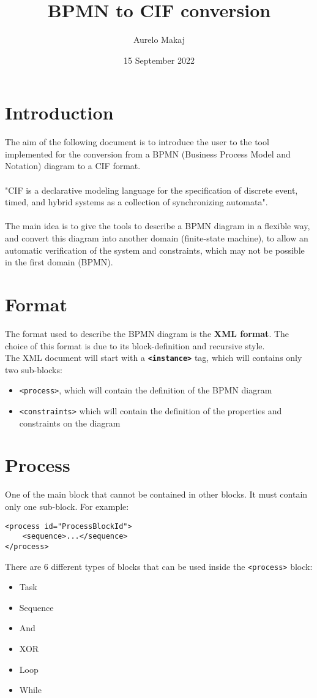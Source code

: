 \documentclass{article}
\title{BPMN to CIF conversion}
\author{Aurelo Makaj}
\date{15 September 2022}
\newcommand*{\xml}[1]{\texttt{<#1>}}
\begin{document}
\maketitle

\section{Introduction}
The aim of the following document is to introduce the user to the tool implemented for the conversion from a BPMN (Business Process Model and Notation) diagram to a CIF format.
\\
\\
"CIF is a declarative modeling language for the specification of discrete event, timed, and hybrid systems as a collection of synchronizing automata".
\\
\\
The main idea is to give the tools to describe a BPMN diagram in a flexible way, and convert this diagram into another domain (finite-state machine), to allow an automatic verification of the system and constraints, which may not be possible in the first domain (BPMN). 


\section{Format}
The format used to describe the BPMN diagram is the \textbf{XML format}. The choice of this format is due to its block-definition and recursive style.\\
The XML document will start with a \textbf{\xml{instance}} tag, which will contains only two sub-blocks:
\begin{itemize}
    \item \xml{process}, which will contain the definition of the BPMN diagram
    \item \xml{constraints} which will contain the definition of the properties and constraints on the diagram
\end{itemize}

\section{Process}
One of the main block that cannot be contained in other blocks. It must contain only one sub-block. For example:
\begin{lstlisting}
<process id="ProcessBlockId">
    <sequence>...</sequence>
</process>
\end{lstlisting}
There are 6 different types of blocks that can be used inside the \xml{process} block:
\begin{itemize}
    \item Task
    \item Sequence
    \item And
    \item XOR
    \item Loop
    \item While
\end{itemize}
\end{document}
